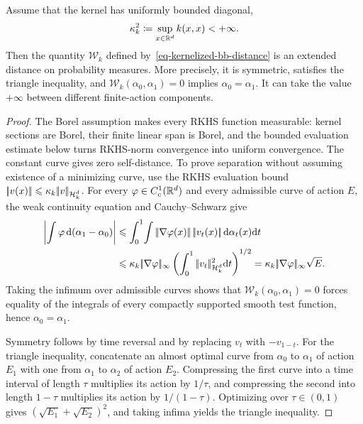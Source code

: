 \begin{prop}\label{prop-kernelized-bb-distance}
	Assume that the kernel has uniformly bounded diagonal,
	\[
		\kappa_k^2\coloneqq\sup_{x\in\mathbb{R}^d}k(x,x)<+\infty.
	\]
	Then the quantity \(\mathcal W_k\) defined by~\eqref{eq-kernelized-bb-distance} is an extended distance on probability measures. More precisely, it is symmetric, satisfies the triangle inequality, and \(\mathcal W_k(\alpha_0,\alpha_1)=0\) implies \(\alpha_0=\alpha_1\). It can take the value \(+\infty\) between different finite-action components.
\end{prop}

\begin{proof}
	The Borel assumption makes every RKHS function measurable: kernel sections are Borel, their finite linear span is Borel, and the bounded evaluation estimate below turns RKHS-norm convergence into uniform convergence. The constant curve gives zero self-distance. To prove separation without assuming existence of a minimizing curve, use the RKHS evaluation bound
	\(|\!| v(x) |\!|\leqslant \kappa_k|\!| v |\!|_{\mathcal{H}_k^d}\).
	For every $\varphi\in C_c^1(\mathbb{R}^d)$ and every admissible curve of action $E$, the weak continuity equation and Cauchy--Schwarz give
	\[
	\begin{aligned}
		\left|\int\varphi\,\d(\alpha_1-\alpha_0)\right|
		&\leq
		\int_0^1\!\int\norm{\nabla\varphi(x)}\,\norm{v_t(x)}\,\d\alpha_t(x)\d t\\
		&\leq
		\kappa_k\norm{\nabla\varphi}_\infty
		\left(\int_0^1\norm{v_t}_{\RKHS_k^d}^2\d t\right)^{1/2}
		=
		\kappa_k\norm{\nabla\varphi}_\infty\sqrt E.
	\end{aligned}
	\]
	Taking the infimum over admissible curves shows that $\mathcal W_k(\alpha_0,\alpha_1)=0$ forces equality of the integrals of every compactly supported smooth test function, hence $\alpha_0=\alpha_1$.

	Symmetry follows by time reversal and by replacing \(v_t\) with \(-v_{1-t}\). For the triangle inequality, concatenate an almost optimal curve from \(\alpha_0\) to \(\alpha_1\) of action \(E_1\) with one from \(\alpha_1\) to \(\alpha_2\) of action \(E_2\). Compressing the first curve into a time interval of length \(\tau\) multiplies its action by \(1/\tau\), and compressing the second into length \(1-\tau\) multiplies its action by \(1/(1-\tau)\). Optimizing over \(\tau\in(0,1)\) gives \((\sqrt{E_1}+\sqrt{E_2})^2\), and taking infima yields the triangle inequality.
\end{proof}

